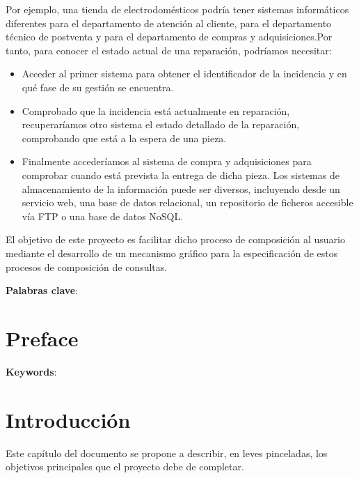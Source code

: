 \documentclass[a4paper,12pt]{book}
\begin{document}
	Por ejemplo, una tienda de electrodomésticos podría tener sistemas informáticos diferentes para el departamento de atención al cliente, para el departamento técnico de postventa y para el departamento de compras y adquisiciones.Por tanto, para conocer el estado actual de una reparación, podríamos necesitar:
		\begin{itemize}
			\item  Acceder al primer sistema para obtener el identificador de la incidencia y en qué fase de su gestión se encuentra.
			\item  Comprobado que la incidencia está actualmente en reparación, recuperaríamos otro sistema el estado detallado de la reparación, comprobando que está a la espera de una pieza.
			\item Finalmente accederíamos al sistema de compra y adquisiciones para comprobar cuando está prevista la entrega de dicha pieza. Los sistemas de almacenamiento de la información puede ser diversos, incluyendo desde un servicio web, una base de datos relacional, un repositorio de ficheros accesible vía FTP o una base de datos NoSQL.
		\end{itemize}
	
	\vspace{5mm}
	
	El objetivo de este proyecto es facilitar dicho proceso de composición al usuario mediante el desarrollo de un mecanismo gráfico para la especificación de estos procesos de composición de consultas.
	

	\vspace{5mm}
	
	\textbf{Palabras clave}: 
	\cleardoublepage
	
	\clearpage
	
	\chapter*{Preface}

	

	\textbf{Keywords}:
	\cleardoublepage
	
	\setcounter{page}{1}
	
	\clearpage
	
	\chapter{Introducción}
	
	Este capítulo del documento se propone a describir, en leves pinceladas, los objetivos principales que el proyecto debe de completar.
	
\end{document}
